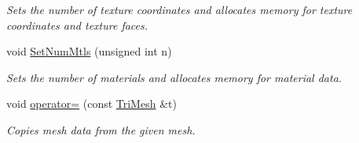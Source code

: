 \begin{Indent}
\begin{DoxyCompactItemize}
\begin{DoxyCompactList}\small\item\em Sets the number of texture coordinates and allocates memory for texture coordinates and texture faces. \end{DoxyCompactList}\item 
\mbox{\label{classcy_1_1_tri_mesh_a9d18a6c73dd67edfb9fda6283136b42e}} 
void \mbox{\hyperlink{classcy_1_1_tri_mesh_a9d18a6c73dd67edfb9fda6283136b42e}{Set\+Num\+Mtls}} (unsigned int n)
\begin{DoxyCompactList}\small\item\em Sets the number of materials and allocates memory for material data. \end{DoxyCompactList}\item 
\mbox{\label{classcy_1_1_tri_mesh_aa6cccc2f90b45ee0bceae7e8c0a4b56e}} 
void \mbox{\hyperlink{classcy_1_1_tri_mesh_aa6cccc2f90b45ee0bceae7e8c0a4b56e}{operator=}} (const \mbox{\hyperlink{classcy_1_1_tri_mesh}{Tri\+Mesh}} \&t)
\begin{DoxyCompactList}\small\item\em Copies mesh data from the given mesh. \end{DoxyCompactList}\end{DoxyCompactItemize}
\end{Indent}
